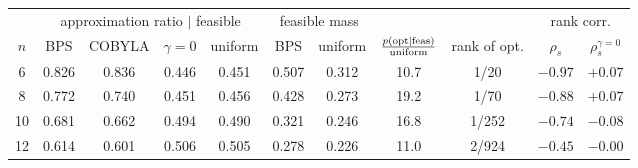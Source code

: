 \begin{tabular}{ccccccccccc}
& \multicolumn{4}{c}{approximation ratio $\mid$ feasible}
 & \multicolumn{2}{c}{feasible mass} & & & \multicolumn{2}{c}{rank corr.} \\
$n$ & BPS & COBYLA & $\gamma{=}0$ & uniform & BPS & uniform
 & $\frac{p({\rm opt}\mid{\rm feas})}{\rm uniform}$ & rank of opt.
 & $\rho_s$ & $\rho_s^{\gamma=0}$ \\
\hline
6 & 0.826 & 0.836 & 0.446 & 0.451 & 0.507 & 0.312 & 10.7 & 1/20 & $-0.97$ & $+0.07$ \\
8 & 0.772 & 0.740 & 0.451 & 0.456 & 0.428 & 0.273 & 19.2 & 1/70 & $-0.88$ & $+0.07$ \\
10 & 0.681 & 0.662 & 0.494 & 0.490 & 0.321 & 0.246 & 16.8 & 1/252 & $-0.74$ & $-0.08$ \\
12 & 0.614 & 0.601 & 0.506 & 0.505 & 0.278 & 0.226 & 11.0 & 2/924 & $-0.45$ & $-0.00$ \\
\end{tabular}